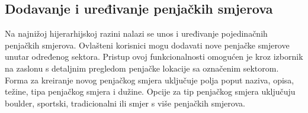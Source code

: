 \subsection{Dodavanje i uređivanje penjačkih smjerova}

Na najnižoj hijerarhijskoj razini nalazi se unos i uređivanje pojedinačnih penjačkih smjerova. Ovlašteni korisnici mogu dodavati nove penjačke smjerove unutar određenog sektora. Pristup ovoj funkcionalnosti omogućen je kroz izbornik na zaslonu s detaljnim pregledom penjačke lokacije sa označenim sektorom. Forma za kreiranje novog penjačkog smjera uključuje polja poput naziva, opisa, težine, tipa penjačkog smjera i dužine. Opcije za tip penjačkog smjera uključuju boulder, sportski, tradicionalni ili smjer s više penjačkih smjerova.

\begin{figure}[H]
    \centering
    \begin{subfigure}[b]{0.38\textwidth}
        \centering

\end{subfigure}
\end{figure}
